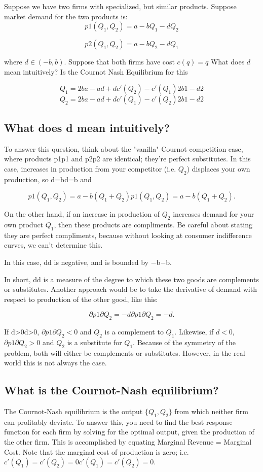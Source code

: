 \documentclass[]{report}
\begin{document}
Suppose we have two firms with specialized, but similar products. Suppose market demand for the two products is:
\[p1(Q_1,Q_2)=a−bQ_1−dQ_2\]

\[p2(Q_1,Q_2)=a−bQ_2−dQ_1\]

where $d\in(−b,b)$. Suppose that both firms have cost $c(q)=q$
What does $d$ mean intuitively? Is the Cournot Nash Equilibrium for this

\[Q_1=2ba−ad+dc′(Q_2)−c′(Q_1)2b1−d2\]
\[Q_2=2ba−ad+dc′(Q_1)−c′(Q_2)2b1−d2\]

\subsection{What does d mean intuitively?}
To answer this question, think about the "vanilla" Cournot competition case, where products p1p1 and p2p2 are identical; they're perfect substitutes. In this case, increases in production from your competitor (i.e. $Q_2$) displaces your own production, so d=bd=b and

\[p1(Q_1,Q_2)=a−b(Q_1+Q_2)p1(Q_1,Q_2)=a−b(Q_1+Q_2).\]

On the other hand, if an increase in production of $Q_2$ increases demand for your own product $Q_1$, then these products are compliments. Be careful about stating they are perfect compliments, because without looking at consumer indifference curves, we can't determine this.

In this case, dd is negative, and is bounded by −b−b.

In short, dd is a measure of the degree to which these two goods are complements or substitutes. Another approach would be to take the derivative of demand with respect to production of the other good, like this:

\[∂p1∂Q_2=−d∂p1∂Q_2=−d.\]

If d>0d>0, $∂p1∂Q_2<0$ and $Q_2$ is a complement to $Q_1$. Likewise, if $d<0$, $∂p1∂Q_2>0$ and $Q_2$ is a substitute for $Q_1$. Because of the symmetry of the problem, both will either be complements or substitutes. However, in the real world this is not always the case.

\subsection{What is the Cournot-Nash equilibrium?}
The Cournot-Nash equilibrium is the output $\{Q_1, Q_2\}$ from which neither firm can profitably deviate. To answer this, you need to find the best response function for each firm by solving for the optimal output, given the production of the other firm. This is accomplished by equating Marginal Revenue = Marginal Cost. Note that the marginal cost of production is zero; i.e.$ c′(Q_1)=c′(Q_2)=0c′(Q_1)=c′(Q_2)=0$.
\end{document}
